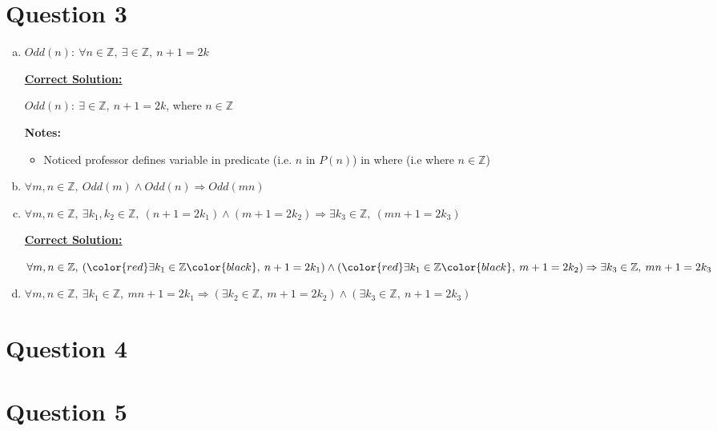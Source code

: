 \documentclass[12pt]{article}
\begin{document}
\section*{Question 3}
\begin{enumerate}[a.]
    \item $Odd(n):\:\forall n \in \mathbb{Z},\:\exists \in \mathbb{Z},\:n+1=2k$

    \bigskip

    \begin{mdframed}
        \underline{\textbf{Correct Solution:}}

        \bigskip

        $Odd(n):\:\exists \in \mathbb{Z},\:n+1=2k$, \color{red}where $n \in \mathbb{Z}$\color{black}
    \end{mdframed}

    \bigskip

    \textbf{Notes:}

    \begin{itemize}
        \item Noticed professor defines variable in predicate (i.e. $n$ in $P(n)$)
    in where (i.e where $n \in \mathbb{Z}$)
    \end{itemize}

    \item $\forall m,n \in \mathbb{Z},\:Odd(m) \land Odd(n) \Rightarrow Odd(mn)$
    \item $\forall m,n \in \mathbb{Z},\:\exists k_1,k_2 \in \mathbb{Z},\:(n+1=2k_1)
    \land (m+1=2k_2) \Rightarrow \exists k_3 \in \mathbb{Z},\:(mn+1=2k_3)$

    \bigskip

    \begin{mdframed}
        \underline{\textbf{Correct Solution:}}

        \bigskip

        $\forall m,n \in \mathbb{Z},\:(\color{red}\exists k_1 \in \mathbb{Z}\color{black},\:n+1=2k_1) \land
        (\color{red}\exists k_1 \in \mathbb{Z}\color{black},\:m+1=2k_2) \Rightarrow \exists k_3 \in \mathbb{Z},\:mn+1=2k_3$
    \end{mdframed}

    \item $\forall m,n \in \mathbb{Z},\:\exists k_1 \in \mathbb{Z},\: mn + 1 = 2k_1
    \Rightarrow (\exists k_2 \in \mathbb{Z},\:m+1 = 2k_2) \land (\exists k_3 \in \mathbb{Z},\:
    n + 1 = 2k_3)$
\end{enumerate}

\section*{Question 4}

\section*{Question 5}
\end{document}
